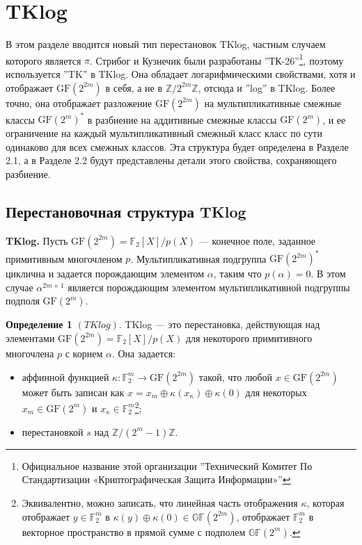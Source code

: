 \section{TKlog}

В этом разделе вводится новый тип перестановок TKlog, частным случаем которого является \(\pi\). Стрибог и Кузнечик были разработаны ''ТК-26''\footnote{Официальное название этой организации ''Технический Комитет По Стандартизации «Криптографическая Защита Информации»''}, поэтому используется ''TK'' в TKlog. Она обладает логарифмическими свойствами, хотя и отображает \(\mathrm{GF}(2^{2m})\) в себя, а не в \(\mathbb{Z}/2^{2m}\mathbb{Z}\), отсюда и ''log'' в TKlog. Более точно, она отображает разложение \(\mathrm{GF}(2^{2m})\) на мультипликативные смежные классы \(\mathrm{GF}(2^m)^*\) в разбиение на аддитивные смежные классы \(\mathrm{GF}(2^m)\), и ее ограничение на каждый мультипликативный смежный класс класс по сути одинаково для всех смежных классов. Эта структура будет определена в Разделе 2.1, а в Разделе 2.2 будут представлены детали этого свойства, сохраняющего разбиение.

\subsection{Перестановочная структура TKlog}

\textbf{TKlog.} Пусть \(\mathrm{GF}(2^{2m}) = \mathbb{F}_2[X]/p(X)\) — конечное поле, заданное примитивным многочленом \(p\). Мультипликативная подгруппа \(\mathrm{GF}(2^{2m})^*\) циклична и задается порождающим элементом \(\alpha\), таким что \(p(\alpha) = 0\). В этом случае \(\alpha^{2m+1}\) является порождающим элементом мультипликативной подгруппы подполя \(\mathrm{GF}(2^m)\).

\textbf{Определение 1} \((TKlog)\). TKlog — это перестановка, действующая над элементами \(\mathrm{GF}(2^{2m}) = \mathbb{F}_2[X]/p(X)\) для некоторого примитивного многочлена \(p\) с корнем \(\alpha\). Она задается:
\begin{itemize}
    \item аффинной функцией \(\kappa : \mathbb{F}^m_2 \to \mathrm{GF}(2^{2m})\) такой, что любой \(x \in \mathrm{GF}(2^{2m})\) может быть записан как \(x = x_m \oplus \kappa(x_\kappa) \oplus \kappa(0)\) для некоторых \(x_m \in \mathrm{GF}(2^m)\) и \(x_\kappa \in \mathbb{F}^m_2\)\footnote{Эквивалентно, можно записать, что линейная часть отображения \(\kappa\), которая отображает \(y \in \mathbb{F}_2^m\) в \(\kappa(y) \oplus \kappa(0) \in \mathbb{GF}(2^{2m})\), отображает \(\mathbb{F}_2^m\) в векторное пространство в прямой сумме с подполем \(\mathbb{GF}(2^m)\).};
    \item перестановкой \(s\) над \(\mathbb{Z}/(2^m - 1)\mathbb{Z}\).
\end{itemize}

